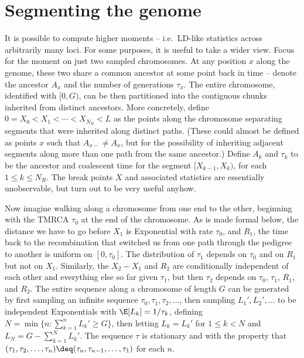 \section{Segmenting the genome}

It is possible to compute higher moments -- i.e.\ LD-like statistics across arbitrarily many loci.
For some purposes, it is useful to take a wider view.
Focus for the moment on just two sampled chromosomes.
At any position $x$ along the genome, these two share a common ancestor at some point back in time --
denote the ancestor $A_x$ and the number of generations $\tau_x$.
The entire chromosome, identified with $[0,G)$,
can be then partitioned into the contiguous chunks inherited from distinct ancestors.
More concretely, define $0 = X_0 < X_1 < \cdots < X_{N_R} < L$ as the points along the chromosome 
separating segments that were inherited along distinct paths.
(These could almost be defined as points $x$ such that $A_{x-} \neq A_x$,
but for the possibility of inheriting adjacent segments along more than one path from the same ancestor.)
Define $A_k$ and $\tau_k$ to be the ancestor and coalescent time for the segment $[X_{k-1},X_k)$, for each $1 \le k \le N_R$.
The break points $X$ and associated statistics are essentially unobservable,
but turn out to be very useful anyhow.

Now imagine walking along a chromosome from one end to the other, beginning with the TMRCA $\tau_0$ at the end of the chromosome.
As is made formal below,
the distance we have to go before $X_1$ is Exponential with rate $\tau_0$,
and $R_1$, the time back to the recombination that switched us from one path through the pedigree to another is uniform on $[0,\tau_0]$.
The distribution of $\tau_1$ depends on $\tau_0$ and on $R_1$ but not on $X_1$.
Similarly, the $X_2-X_1$ and $R_2$ are conditionally independent of each other and everything else so far given $\tau_1$,
but then $\tau_2$ depends on $\tau_0$, $\tau_1$, $R_1$, and $R_2$.
The entire sequence along a chromosome of length $G$ can be generated
by first sampling an infinite sequence $\tau_0,\tau_1,\tau_2,\ldots$,
then sampling $L_1', L_2', \ldots$ to be independent Exponentials with $\E[L_k] = 1/\tau_k$,
defining $N = \min \{n : \sum_{k =1}^n L_k' \ge G \}$,
then letting $L_k = L_k'$ for $1 \le k < N$ and $L_N = G - \sum_{k =1}^N L_k'$.
The sequence $\tau$ is stationary
and with the property that $(\tau_1, \tau_2, \ldots, \tau_n) \deq  (\tau_n, \tau_{n-1}, \ldots, \tau_1)$ for each $n$.


